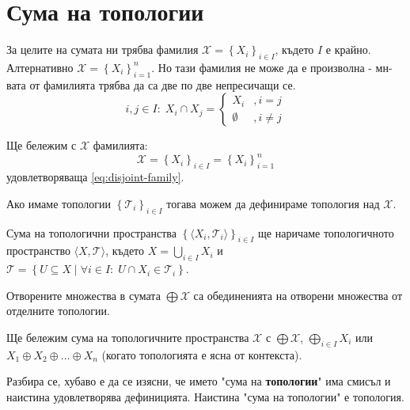 \section{Сума на топологии}
За целите на сумата ни трябва фамилия $\mathcal X = \left\{X_i\right\}_{i \in I}$, където $I$ е крайно. Алтернативно $\mathcal X = \left\{X_i\right\}_{i=1}^{n}$. Но тази фамилия не може да е произволна - мн-вата от фамилията трябва да са две по две непресичащи се.
\begin{equation} \label{eq:disjoint-family}
    i,j \in I:\; X_i \cap X_j = \begin{cases}
        X_i       & , i=j     \\
        \emptyset & , i\neq j
    \end{cases}
\end{equation}
\begin{notation}
    Ще бележим с $\mathcal X$ фамилията:
    \begin{equation*}
        \mathcal X = \left\{X_i\right\}_{i \in I} = \left\{X_i\right\}_{i=1}^{n}
    \end{equation*}
    удовлетворяваща \eqref{eq:disjoint-family}.
\end{notation}

Ако имаме топологии $\left\{\mathcal T_i\right\}_{i \in I}$ тогава можем да дефинираме топология над $\mathcal X$.
\begin{definition}\label{def:sum-topologies}
    Сума на топологични пространства $\left\{\langle X_i, \mathcal T_i\rangle\right\}_{i \in I}$ ще наричаме топологичното пространство $\langle X, \mathcal T\rangle$, където $X = \bigcup\limits_{i\in I}X_i$ и $\mathcal T = \left\{ U \subseteq X \mid \forall i \in I:\; U \cap X_i \in \mathcal T_i \right\}$.
\end{definition}
\begin{fact}
    Отворените множества в сумата $\bigoplus \mathcal X$ са обединенията на отворени множества от отделните топологии.
\end{fact}
\begin{notation}
    Ще бележим сума на топологичните пространства $\mathcal X$ с $\bigoplus \mathcal X$, $\bigoplus\limits_{i\in I} X_i$ или $X_1 \oplus X_2 \oplus \dots \oplus X_n$ (когато топологията е ясна от контекста).
\end{notation}
Разбира се, хубаво е да се изясни, че името "сума на \textbf{топологии}" има смисъл и наистина удовлетворява дефиницията. Наистина "сума на топологии" е топология.

